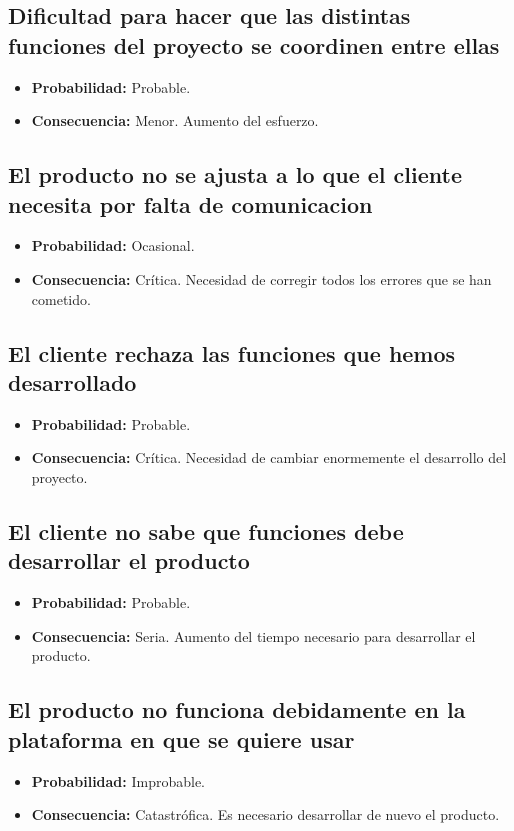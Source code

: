 \documentclass[spanish,a4paper,12pt]{report}	%
\begin{document}
\subsection*{Dificultad para hacer que las distintas funciones del proyecto se coordinen entre ellas}
	\begin{itemize}
		\item \textbf {Probabilidad: }Probable.
		\item \textbf {Consecuencia: }Menor. Aumento del esfuerzo.
	\end{itemize}

\subsection*{El producto no se ajusta a lo que el cliente necesita por falta de comunicacion}
	\begin{itemize}
		\item \textbf {Probabilidad: }Ocasional.
		\item \textbf {Consecuencia: }Crítica. Necesidad de corregir todos los errores que se han cometido.
	\end{itemize}

\subsection*{El cliente rechaza las funciones que hemos desarrollado}
	\begin{itemize}
		\item \textbf {Probabilidad: }Probable.
		\item \textbf {Consecuencia: }Crítica. Necesidad de cambiar enormemente el desarrollo del proyecto.
	\end{itemize}

\subsection*{El cliente no sabe que funciones debe desarrollar el producto}
	\begin{itemize}
		\item \textbf {Probabilidad: }Probable.
		\item \textbf {Consecuencia: }Seria. Aumento del tiempo necesario para desarrollar el producto.
	\end{itemize}

\subsection*{El producto no funciona debidamente en la plataforma en que se quiere usar}
	\begin{itemize}
		\item \textbf {Probabilidad: }Improbable.
		\item \textbf {Consecuencia: }Catastrófica. Es necesario desarrollar de nuevo el producto.
	\end{itemize}
\end{document}
